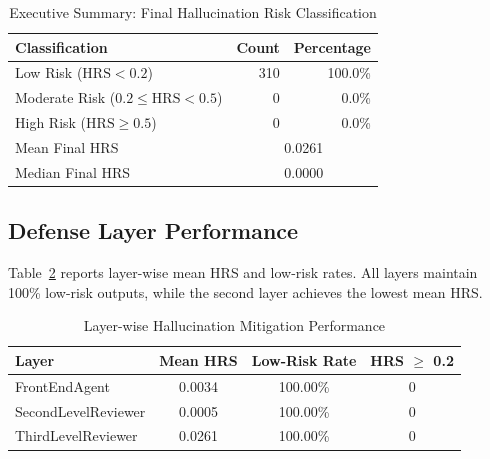 \documentclass[11pt,a4paper]{article}
\begin{document}
\begin{table}[!htbp]
\centering
\caption{Executive Summary: Final Hallucination Risk Classification}
\label{tab:executive_summary}
\begin{tabular}{lrr}
\toprule
\textbf{Classification} & \textbf{Count} & \textbf{Percentage} \\
\midrule
Low Risk ($\mathrm{HRS}<0.2$) & 310 & 100.0\% \\
Moderate Risk ($0.2\leq \mathrm{HRS}<0.5$) & 0 & 0.0\% \\
High Risk ($\mathrm{HRS}\geq 0.5$) & 0 & 0.0\% \\
\midrule
Mean Final HRS & \multicolumn{2}{c}{0.0261} \\
Median Final HRS & \multicolumn{2}{c}{0.0000} \\
\bottomrule
\end{tabular}
\end{table}

\subsection{Defense Layer Performance}

Table~\ref{tab:defense_layers} reports layer-wise mean HRS and low-risk rates. All layers maintain 100\% low-risk outputs, while the second layer achieves the lowest mean HRS.

\begin{table}[!htbp]
\centering
\caption{Layer-wise Hallucination Mitigation Performance}
\label{tab:defense_layers}
\begin{tabular}{lccc}
\toprule
\textbf{Layer} & \textbf{Mean HRS} & \textbf{Low-Risk Rate} & \textbf{HRS $\geq$ 0.2} \\
\midrule
FrontEndAgent & 0.0034 & 100.00\% & 0 \\
SecondLevelReviewer & 0.0005 & 100.00\% & 0 \\
ThirdLevelReviewer & 0.0261 & 100.00\% & 0 \\
\bottomrule
\end{tabular}
\end{table}
\end{document}
